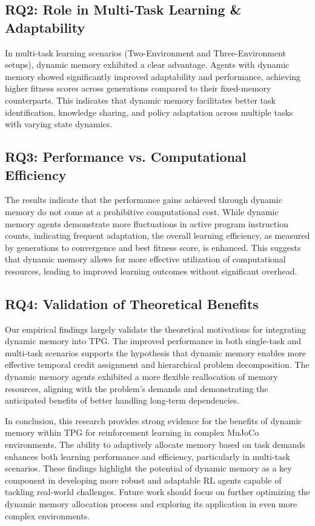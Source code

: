 \documentclass[sigconf]{acmart}
\begin{document}
\subsection{RQ2: Role in Multi-Task Learning \& Adaptability} 
In multi-task learning scenarios (Two-Environment and Three-Environment setups), dynamic memory exhibited a clear advantage. 
Agents with dynamic memory showed significantly improved adaptability and performance, achieving 
higher fitness scores across generations compared to their fixed-memory counterparts. This indicates 
that dynamic memory facilitates better task identification, knowledge sharing, and policy adaptation 
across multiple tasks with varying state dynamics.

\subsection{RQ3: Performance vs. Computational Efficiency}
The results indicate that the performance gains achieved through dynamic memory do not come at a 
prohibitive computational cost. While dynamic memory agents demonstrate more fluctuations in active 
program instruction counts, indicating frequent adaptation, the overall learning efficiency, as measured 
by generations to convergence and best fitness score, is enhanced. This suggests that dynamic memory 
allows for more effective utilization of computational resources, leading to improved learning outcomes without significant overhead.

\subsection{RQ4: Validation of Theoretical Benefits}
Our empirical findings largely validate the theoretical motivations 
for integrating dynamic memory into TPG. The improved performance in both single-task and multi-task scenarios supports 
the hypothesis that dynamic memory enables more effective temporal credit assignment and hierarchical problem decomposition. 
The dynamic memory agents exhibited a more flexible reallocation of memory resources, aligning with the problem's demands 
and demonstrating the anticipated benefits of better handling long-term dependencies.

In conclusion, this research provides strong evidence for the benefits of dynamic memory within TPG for reinforcement 
learning in complex MuJoCo environments. The ability to adaptively allocate memory based on task demands enhances both 
learning performance and efficiency, particularly in multi-task scenarios. These findings highlight the potential of 
dynamic memory as a key component in developing more robust and adaptable RL agents capable of tackling real-world challenges. 
Future work should focus on further optimizing the dynamic memory allocation process and exploring its application 
in even more complex environments.
\end{document}
